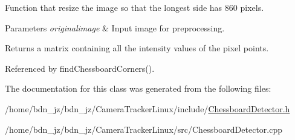 Function that resize the image so that the longest side has 860 pixels. 


\begin{DoxyParams}{Parameters}
{\em originalimage} & Input image for preprocessing. \\
\hline
\end{DoxyParams}
\begin{DoxyReturn}{Returns}
a matrix containing all the intensity values of the pixel points. 
\end{DoxyReturn}


Referenced by find\+Chessboard\+Corners().



The documentation for this class was generated from the following files\+:\begin{DoxyCompactItemize}
\item 
/home/bdn\+\_\+jz/bdn\+\_\+jz/\+Camera\+Tracker\+Linux/include/\hyperlink{ChessboardDetector_8h}{Chessboard\+Detector.\+h}\item 
/home/bdn\+\_\+jz/bdn\+\_\+jz/\+Camera\+Tracker\+Linux/src/Chessboard\+Detector.\+cpp\end{DoxyCompactItemize}
